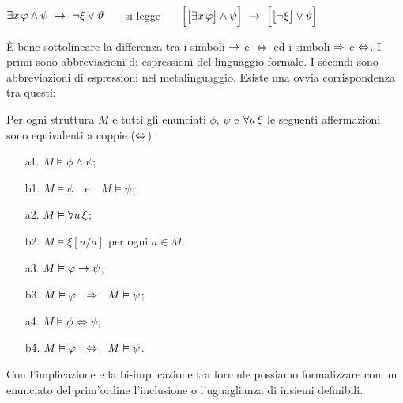 \hfil$\E x\,\phi \wedge \psi\ \imp\ \neg\xi\vee\theta$ \ \ \ si legge \ \ \ $\Big[\big[\E x\,\phi\big]\wedge\psi\Big]\ \imp\ \Big[\big[\neg\xi\big]\vee\theta\Big]$
 
\`E bene sottolineare la differenza tra i simboli $\rightarrow$ e $\iff$ ed i simboli $\Rightarrow$ e $\Leftrightarrow$. I primi sono abbreviazioni di espressioni del linguaggio formale. I secondi sono abbreviazioni di espressioni nel metalinguaggio. Esiste una ovvia corrispondenza tra questi:

\begin{proposition} Per ogni struttura $M$ e tutti gli enunciati $\phi$, $\psi$ e $\forall u\,\xi$ le seguenti affermazioni sono equivalenti a coppie ($\Leftrightarrow$):
\par\medskip
\begin{minipage}[b]{.50\textwidth}
\begin{itemize}
\item[a1.] $M\models \phi\wedge\psi$;
\item[b1.] $M\models \phi$\ \ e\ \  $M\models\psi$;
\end{itemize}
\end{minipage}
%
\begin{minipage}[b]{.49\textwidth}
\begin{itemize}
\item[a2.] $M\vDash \forall u\,\xi$;
\item[b2.] $M\models \xi[u/a]$ per ogni $a\in M$.
\end{itemize}
\end{minipage}
\par\bigskip
\begin{minipage}[b]{.50\textwidth}
\begin{itemize}
\item[a3.] $M\vDash \varphi\rightarrow\psi$;
\item[b3.] $M\models \phi\ \ \IMP\ \ M\models\psi$;
\end{itemize}
\end{minipage}
%
\begin{minipage}[b]{.49\textwidth}
\begin{itemize}
\item[a4.] $M\models \phi\iff\psi$;
\item[b4.] $M\models \phi\ \ \IFF\ \ M\models\psi$.
\end{itemize}
\end{minipage}\QED
\end{proposition}

Con l'implicazione e la bi-implicazione tra formule possiamo formalizzare con un enunciato del prim'ordine l'inclusione o l'uguaglianza di insiemi definibili.

